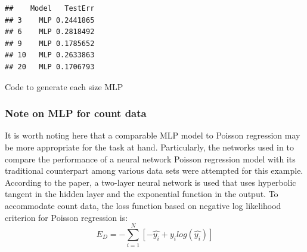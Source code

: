 \begin{Shaded}
\begin{Highlighting}[]
\OtherTok{\textless{}{-}} \SpecialCharTok{\textasciitilde{}}
                      \NormalTok{,}
                      

\OtherTok{\textless{}{-}} \SpecialCharTok{\^{}} \NormalTok{(}\SpecialCharTok{$}

\OtherTok{\textless{}{-}} \SpecialCharTok{$}\SpecialCharTok{{-}}\SpecialCharTok{\^{}}\NormalTok{) }
\NormalTok{  \}}

\OtherTok{\textless{}{-}} 
  

\NormalTok{\}}


\OtherTok{\textless{}{-}} \NormalTok{(}\NormalTok{(} \NormalTok{, }
\end{Highlighting}
\end{Shaded}

\begin{verbatim}
##    Model   TestErr
## 3    MLP 0.2441865
## 6    MLP 0.2818492
## 9    MLP 0.1785652
## 10   MLP 0.2633863
## 20   MLP 0.1706793
\end{verbatim}

Code to generate each size MLP

\hypertarget{note-on-mlp-for-count-data}{%
\subsubsection{Note on MLP for count
data}\label{note-on-mlp-for-count-data}}

It is worth noting here that a comparable MLP model to Poisson
regression may be more appropriate for the task at hand. Particularly,
the networks used in \cite{fallah2009nonlinear} to compare the
performance of a neural network Poisson regression model with its
traditional counterpart among various data sets were attempted for this
example. According to the paper, a two-layer neural network is used that
uses hyperbolic tangent in the hidden layer and the exponential function
in the output. To accommodate count data, the loss function based on
negative log likelihood criterion for Poisson regression is: \[
E_D = - \sum_{i=1}^N \left[ -\hat{y_i} + y_i log(\hat{y_i}) \right]
\]

